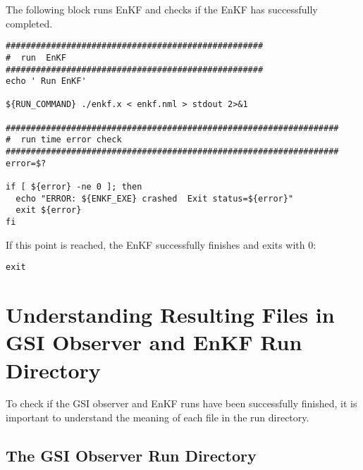 The following block runs EnKF and checks if the EnKF has successfully completed.
\begin{scriptsize}
\begin{verbatim}
###################################################
#  run  EnKF
###################################################
echo ' Run EnKF'

${RUN_COMMAND} ./enkf.x < enkf.nml > stdout 2>&1

##################################################################
#  run time error check
##################################################################
error=$?

if [ ${error} -ne 0 ]; then
  echo "ERROR: ${ENKF_EXE} crashed  Exit status=${error}"
  exit ${error}
fi
\end{verbatim}
\end{scriptsize}

If this point is reached, the EnKF successfully finishes and exits with 0:
\begin{scriptsize}
\begin{verbatim}
exit
\end{verbatim}
\end{scriptsize}


\section{Understanding Resulting Files in GSI Observer and EnKF Run Directory}

To check if the GSI observer and EnKF runs have been successfully finished, it is important to understand the meaning of each file in the run directory.

\subsection{The GSI Observer Run Directory}


